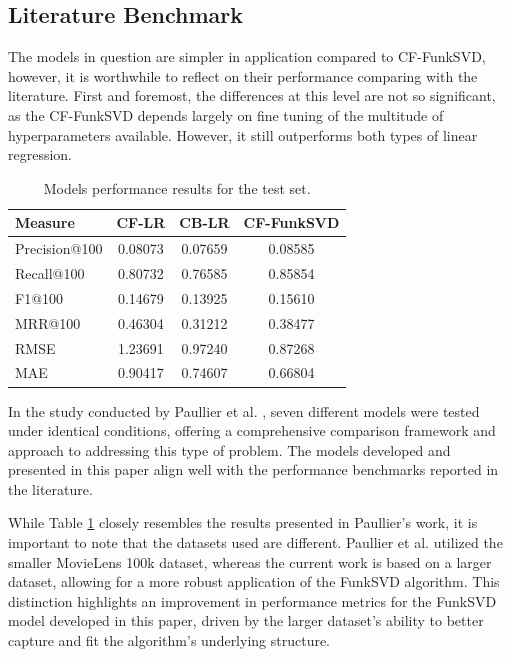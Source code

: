 \documentclass[conference]{IEEEtran}
\begin{document}
\subsection{Literature Benchmark}

The models in question are simpler in application compared to CF-FunkSVD, however, it is worthwhile to reflect on their performance comparing with the literature. First and foremost, the differences at this level are not so significant, as the CF-FunkSVD depends largely on fine tuning of the multitude of hyperparameters available. However, it still outperforms both types of linear regression.

\begin{table}[H]
\centering
\caption{Models performance results for the test set.}
\label{tab:atk_results_benchamarkpaper}
\begin{tabular}{lccc}
\toprule
\textbf{Measure} & \textbf{CF-LR} & \textbf{CB-LR} & \textbf{CF-FunkSVD} \\
\midrule
Precision@100 & 0.08073 & 0.07659 & 0.08585 \\
Recall@100 & 0.80732 & 0.76585 & 0.85854 \\
F1@100 & 0.14679 & 0.13925 & 0.15610 \\
MRR@100 & 0.46304 & 0.31212 & 0.38477 \\
RMSE & 1.23691 & 0.97240 & 0.87268 \\
MAE & 0.90417 & 0.74607 & 0.66804 \\
\bottomrule
\end{tabular}
\end{table}

In the study conducted by Paullier et al. \cite{9379914}, seven different models were tested under identical conditions, offering a comprehensive comparison framework and approach to addressing this type of problem. The models developed and presented in this paper align well with the performance benchmarks reported in the literature.

While Table \ref{tab:atk_results_benchamarkpaper} closely resembles the results presented in Paullier’s work, it is important to note that the datasets used are different. Paullier et al. utilized the smaller MovieLens 100k dataset, whereas the current work is based on a larger dataset, allowing for a more robust application of the FunkSVD algorithm. This distinction highlights an improvement in performance metrics for the FunkSVD model developed in this paper, driven by the larger dataset’s ability to better capture and fit the algorithm's underlying structure.
\end{document}
